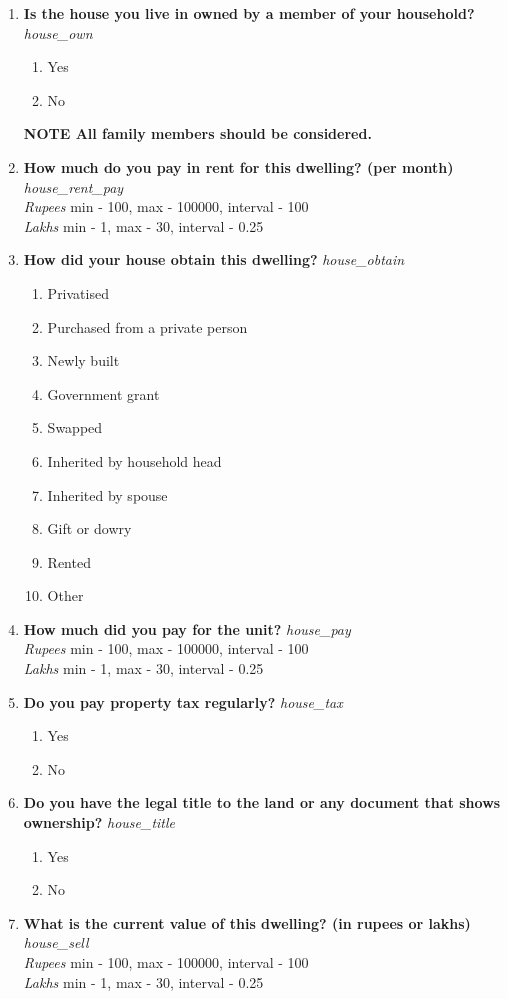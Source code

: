 \documentclass{article}
\begin{document}
\begin{enumerate}
\begin{enumerate}[label*=\arabic*.]
\end{enumerate} 
\item {\bfseries Is the house you live in owned by a member of your household?}\emph{ house\_own } 
\begin{enumerate} 
\item Yes 
\item No 
\end{enumerate}\textbf{{\footnotesize NOTE} All family members should be considered. } 
 
\item {\bfseries How much do you pay in rent for this dwelling? (per month)}\emph{ house\_rent\_pay } 
\\ \emph{ Rupees }min - 100, max - 100000, interval - 100 
\\ \emph{ Lakhs }min - 1, max - 30, interval - 0.25 
 
\item {\bfseries How did your house obtain this dwelling?}\emph{ house\_obtain } 
\begin{enumerate} 
\item Privatised 
\item Purchased from a private person 
\item Newly built 
\item Government grant 
\item Swapped 
\item Inherited by household head 
\item Inherited by spouse 
\item Gift or dowry 
\item Rented 
\item Other 
\end{enumerate} 
\item {\bfseries How much did you pay for the unit?}\emph{ house\_pay } 
\\ \emph{ Rupees }min - 100, max - 100000, interval - 100 
\\ \emph{ Lakhs }min - 1, max - 30, interval - 0.25 
 
\item {\bfseries Do you pay property tax regularly?}\emph{ house\_tax } 
\begin{enumerate} 
\item Yes 
\item No 
\end{enumerate} 
\item {\bfseries Do you have the legal title to the land or any document that shows ownership?}\emph{ house\_title } 
\begin{enumerate} 
\item Yes 
\item No 
\end{enumerate} 
\item {\bfseries What is the current value of this dwelling? (in rupees or lakhs)}\emph{ house\_sell } 
\\ \emph{ Rupees }min - 100, max - 100000, interval - 100 
\\ \emph{ Lakhs }min - 1, max - 30, interval - 0.25 
 

\end{enumerate}
\end{document}
